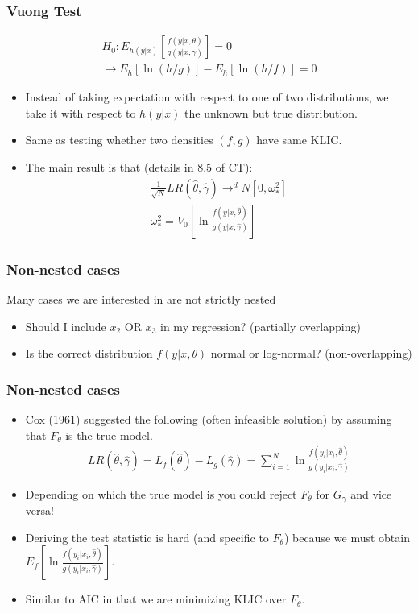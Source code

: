 \begin{frame}
\frametitle{Vuong Test}
\begin{eqnarray*}
H_0: E_{h(y|x)} \left[ \frac{ f(y | x,\theta) }{g(y | x, \gamma)} \right] = 0  \\
\rightarrow E_h[\ln(h/g)] - E_h[\ln (h/f)] = 0
\end{eqnarray*}
\begin{itemize}
\item Instead of taking expectation with respect to one of two distributions, we take it with respect to $h(y |x)$ the unknown but \alert{true distribution}.
\item Same as testing whether two densities $(f,g)$ have same KLIC.
\item The main result is that (details in 8.5 of CT):
\begin{eqnarray*}
\frac{1}{\sqrt{N}} LR(\hat{\theta},\hat{\gamma}) \rightarrow^d N [0,\omega_{*}^2]\\
\omega_{*}^2 =  V_0 \left[ \ln \frac{f(y| x, \hat{\theta})}{g(y| x, \hat{\gamma})}  \right]
\end{eqnarray*}
\end{itemize}
\end{frame}


\begin{frame}
\frametitle{Non-nested cases}
Many cases we are interested in are \alert{not strictly nested}
\begin{itemize}
\item Should I include $x_2$ OR $x_3$ in my regression? (partially overlapping)
\item Is the correct distribution $f(y | x, \theta)$ normal or log-normal? (non-overlapping)
\end{itemize}
\end{frame}

\begin{frame}
\frametitle{Non-nested cases}
\begin{itemize}
\item Cox (1961) suggested the following (often infeasible solution) by assuming that $F_{\theta}$ is the true model.
\begin{eqnarray*}
LR(\hat{\theta},\hat{\gamma}) = L_f(\hat{\theta}) - L_g (\hat{\gamma}) = \sum_{i=1}^N \ln \frac{f(y_i | x_i, \hat{\theta})}{g(y_i | x_i, \hat{\gamma})}
\end{eqnarray*}
\item Depending on which the true model is you could reject $F_{\theta}$ for $G_{\gamma}$ and vice versa!
\item Deriving the test statistic is hard (and specific to $F_{\theta}$) because we must obtain $E_f [\ln \frac{f(y_i | x_i, \hat{\theta})}{g(y_i | x_i, \hat{\gamma})}]$.
\item Similar to AIC in that we are minimizing KLIC over $F_{\theta}$.
\end{itemize}
\end{frame}

